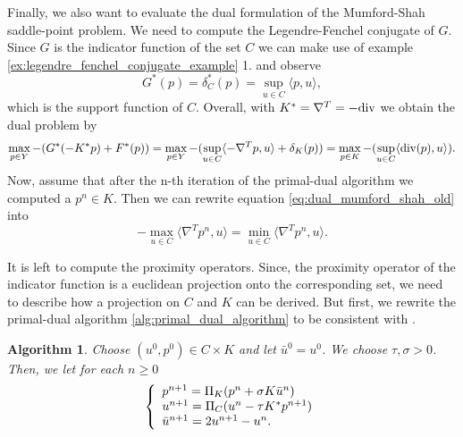 \documentclass{scrreprt}
\newtheorem{algorithm}[theorem]{Algorithm}
\begin{document}
    	Finally, we also want to evaluate the dual formulation of the Mumford-Shah saddle-point problem. We need to compute the Legendre-Fenchel conjugate of $G$. Since $G$ is the indicator function of the set $C$ we can make use of example \ref{ex:legendre_fenchel_conjugate_example} 1. and observe
            $$
                G^{\ast}(p) = \delta^{\ast}_{C}(p) = \sup\limits_{u \in C} \langle p, u \rangle,
            $$
        which is the support function of $C$. Overall, with $K^{\ast} = \nabla^{T} = -\textnormal{div}$ we obtain the dual problem by
        	\begin{equation}
        		\max_{p \in Y} -(G^{\ast}(-K^{\ast}p) + F^{\ast}(p)) = \max_{p \in Y} -(\sup\limits_{u \in C} \langle -\nabla^{T}p, u \rangle + \delta_{K}(p)) = \max_{p \in K} -(\sup\limits_{u \in C} \langle \textnormal{div}(p), u \rangle).
        	\label{eq:dual_mumford_shah_old}
        	\end{equation}
        Now, assume that after the n-th iteration of the primal-dual algorithm we computed a $p^{n} \in K$. Then we can rewrite equation \ref{eq:dual_mumford_shah_old} into
            \begin{equation}
                -\max_{u \in C} \langle \nabla^{T}p^{n}, u \rangle = \min_{u \in C} \langle \nabla^{T}p^{n}, u \rangle.
            \label{eq:dual_mumford_shah}
            \end{equation}
        
        It is left to compute the proximity operators. Since, the proximity operator of the indicator function is a euclidean projection onto the corresponding set, we need to describe how a projection on $C$ and $K$ can be derived. But first, we rewrite the primal-dual algorithm \ref{alg:primal_dual_algorithm} to be consistent with \cite{Pock-et-al-iccv09}.

    		\begin{algorithm}\label{alg:primal_dual_cremers}
                Choose $(u^{0}, p^{0}) \in C \times K$ and let $\bar{u}^{0} = u^{0}$. We choose $\tau, \sigma > 0$. Then, we let for each $n \ge 0$
                    \begin{equation}
                        \left\{ 
                            \begin{array}{l l}
                              p^{n+1} = \Pi_{K} (p^{n} + \sigma K \bar{u}^{n}) \\
                              u^{n+1} = \Pi_{C} (u^{n} - \tau K^{*} p^{n+1}) \\
                              \bar{u}^{n+1} = 2u^{n+1} - u^{n}.
                            \end{array}
                        \right.
                    \end{equation}
            \end{algorithm}
\end{document}
